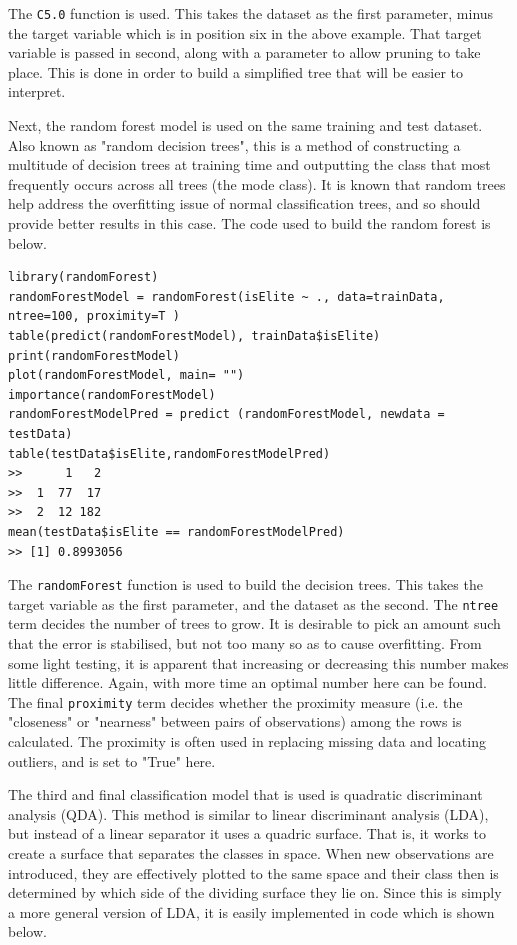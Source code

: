 \documentclass[paper=a4, fontsize=11pt]{scrartcl} %
\begin{document}
{{\begin{lstlisting}
\end{lstlisting}
The \texttt{C5.0} function is used. This takes the dataset as the first parameter, minus the target variable which is in position six in the above example. That target variable is passed in second, along with a parameter to allow pruning to take place. This is done in order to build a simplified tree that will be easier to interpret.}
{\par Next, the random forest model is used on the same training and test dataset. Also known as "random decision trees", this is a method of constructing a multitude of decision trees at training time and outputting the class that most frequently occurs across all trees (the mode class). It is known that random trees help address the overfitting issue of normal classification trees, and so should provide better results in this case. The code used to build the random forest is below. 
\begin{lstlisting}
library(randomForest)
randomForestModel = randomForest(isElite ~ ., data=trainData, ntree=100, proximity=T )
table(predict(randomForestModel), trainData$isElite)
print(randomForestModel)
plot(randomForestModel, main= "")
importance(randomForestModel)
randomForestModelPred = predict (randomForestModel, newdata = testData)
table(testData$isElite,randomForestModelPred)
>>      1   2
>>  1  77  17
>>  2  12 182
mean(testData$isElite == randomForestModelPred) 
>> [1] 0.8993056
\end{lstlisting}
The \texttt{randomForest} function is used to build the decision trees. This takes the target variable as the first parameter, and the dataset as the second. The \texttt{ntree} term decides the number of trees to grow. It is desirable to pick an amount such that the error is stabilised, but not too many so as to cause overfitting. From some light testing, it is apparent that increasing or decreasing this number makes little difference. Again, with more time an optimal number here can be found. The final \texttt{proximity} term decides whether the proximity measure (i.e. the "closeness" or "nearness" between pairs of observations) among the rows is calculated. The proximity is often used in replacing missing data and locating outliers, and is set to "True" here.
}
{\par The third and final classification model that is used is quadratic discriminant analysis (QDA). This method is similar to linear discriminant analysis (LDA), but instead of a linear separator it uses a quadric surface. That is, it works to create a surface that separates the classes in space. When new observations are introduced, they are effectively plotted to the same space and their class then is determined by which side of the dividing surface they lie on. Since this is simply a more general version of LDA, it is easily implemented in code which is shown below.
}}
\end{document}
